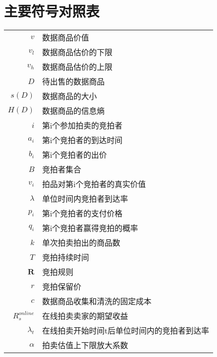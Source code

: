 \chapter{主要符号对照表}
\label{chap:symb}

\begin{longtable}{rl}
$v$     & 数据商品价值 \\
$v_l$ 	& 数据商品估价的下限 \\
$v_h$ 	& 数据商品估价的上限 \\
$D$ 	& 待出售的数据商品 \\
$s(D)$ 	& 数据商品的大小 \\
$H(D)$ 	& 数据商品的信息熵 \\
$i$ 	& 第i个参加拍卖的竞拍者 \\
$a_i$ 	& 第i个竞拍者的到达时间 \\
$b_i$ 	& 第i个竞拍者的出价 \\
$B$		& 竞拍者集合 \\
$v_i$ 	& 拍品对第i个竞拍者的真实价值 \\
$\lambda$ 	& 单位时间内竞拍者到达率 \\
$p_i$ 	& 第i个竞拍者的支付价格 \\
$q_i$ 	& 第i个竞拍者赢得竞拍的概率 \\
$k$ 	& 单次拍卖拍出的商品数 \\
$T$ 	& 竞拍持续时间 \\
$\textbf{R}$ 	& 竞拍规则 \\
$r$ 	& 竞拍保留价 \\
$c$ 	& 数据商品收集和清洗的固定成本 \\
$R_s^{online}$ 	& 在线拍卖卖家的期望收益 \\
$\lambda_t$ & 在线拍卖开始时间t后单位时间内的竞拍者到达率\\
$\alpha$ 	& 拍卖估值上下限放大系数 \\
 
\end{longtable}
